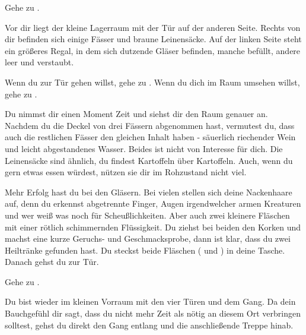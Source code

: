 Gehe zu .


Vor dir liegt der kleine Lagerraum mit der Tür auf der anderen Seite. Rechts von dir befinden sich einige Fässer und braune Leinensäcke. Auf der linken Seite steht ein größeres Regal, in dem sich dutzende Gläser befinden, manche befüllt, andere leer und verstaubt.

Wenn du zur Tür gehen willst, gehe zu .
Wenn du dich im Raum umsehen willst, gehe zu .


Du nimmst dir einen Moment Zeit und siehst dir den Raum genauer an. Nachdem du die Deckel von drei Fässern abgenommen hast, vermutest du, dass auch die restlichen Fässer den gleichen Inhalt haben - säuerlich riechender Wein und leicht abgestandenes Wasser. Beides ist nicht von Interesse für dich. Die Leinensäcke sind ähnlich, du findest Kartoffeln über Kartoffeln. Auch, wenn du gern etwas essen würdest, nützen sie dir im Rohzustand nicht viel.

Mehr Erfolg hast du bei den Gläsern. Bei vielen stellen sich deine Nackenhaare auf, denn du erkennst abgetrennte Finger, Augen irgendwelcher armen Kreaturen und wer weiß was noch für Scheußlichkeiten. Aber auch zwei kleinere Fläschen mit einer rötlich schimmernden Flüssigkeit. Du ziehst bei beiden den Korken und machst eine kurze Geruchs- und Geschmacksprobe, dann ist klar, dass du zwei Heiltränke gefunden hast. Du steckst beide Fläschen ( und ) in deine Tasche. Danach gehst du zur Tür.

Gehe zu .


Du bist wieder im kleinen Vorraum mit den vier Türen und dem Gang. Da dein Bauchgefühl dir sagt, dass du nicht mehr Zeit als nötig an diesem Ort verbringen solltest, gehst du direkt den Gang entlang und die anschließende Treppe hinab.

